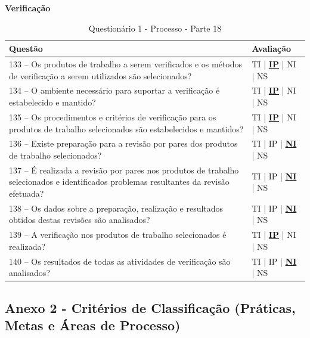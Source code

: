 \documentclass[openany,10pt,a4paper]{article}
\begin{document}
\begin{appendix}
	\begin{table}[h]
	\textbf{Verificação }
		\centering
		\caption{Questionário 1 - Processo - Parte 18}
		\begin{tabular}{p{5in}p{1in}}		
			\toprule
			\textbf{Questão}  & \textbf{Avaliação}\\ 
			\midrule
			133 – Os produtos de trabalho a serem verificados e os métodos de verificação a serem 
	utilizados são selecionados?
	 & TI | \underline{\textbf{IP}} | NI | NS \\
			\midrule
			134 – O ambiente necessário para suportar a verificação é estabelecido e mantido?
	 & TI | \underline{\textbf{IP}} | NI | NS \\
			\midrule
			135 – Os procedimentos e critérios de verificação para os produtos de trabalho selecionados são 
	estabelecidos e mantidos?
	 & TI | \underline{\textbf{IP}} | NI | NS \\
			\midrule
			136 – Existe preparação para a revisão por pares dos produtos de trabalho selecionados?
	 & TI | IP | \underline{\textbf{NI}} | NS \\
			\midrule
			137 – É realizada a revisão por pares nos produtos de trabalho selecionados e identificados 
	problemas resultantes da revisão efetuada?
	  & TI | IP | \underline{\textbf{NI}} | NS \\
			\midrule
			138 – Os dados sobre a preparação, realização e resultados obtidos destas revisões são 
	analisados?
	 & TI | IP | \underline{\textbf{NI}} | NS \\
	 \midrule
			139 – A verificação nos produtos de trabalho selecionados é realizada?
	 & TI | \underline{\textbf{IP}} | NI | NS \\
	  \midrule
			140 – Os resultados de todas as atividades de verificação são analisados? 
	 & TI | IP | \underline{\textbf{NI}} | NS \\
			\bottomrule
		\end{tabular} 
	\end{table}
	
\subsection{Anexo 2 - Critérios de Classificação (Práticas, Metas e Áreas de Processo)}


\end{appendix}
\end{document}
